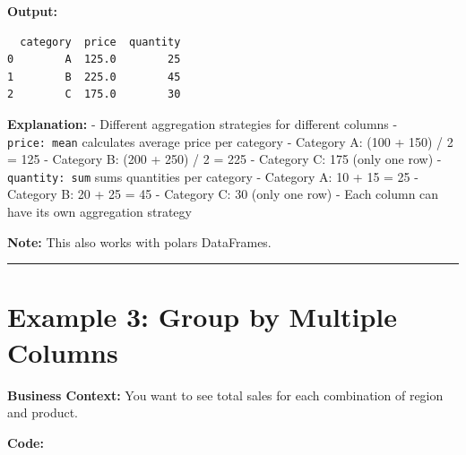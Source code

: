 \documentclass[
  letterpaper,
]{scrbook}
\begin{document}
\textbf{Output:}

\begin{verbatim}
  category  price  quantity
0        A  125.0        25
1        B  225.0        45
2        C  175.0        30
\end{verbatim}

\textbf{Explanation:} - Different aggregation strategies for different
columns -
\texttt{\textquotesingle{}price\textquotesingle{}:\ \textquotesingle{}mean\textquotesingle{}}
calculates average price per category - Category A: (100 + 150) / 2 =
125 - Category B: (200 + 250) / 2 = 225 - Category C: 175 (only one row)
-
\texttt{\textquotesingle{}quantity\textquotesingle{}:\ \textquotesingle{}sum\textquotesingle{}}
sums quantities per category - Category A: 10 + 15 = 25 - Category B: 20
+ 25 = 45 - Category C: 30 (only one row) - Each column can have its own
aggregation strategy

\textbf{Note:} This also works with polars DataFrames.

\begin{center}\rule{0.5\linewidth}{0.5pt}\end{center}

\section{Example 3: Group by Multiple
Columns}\label{example-3-group-by-multiple-columns}

\textbf{Business Context:} You want to see total sales for each
combination of region and product.

\textbf{Code:}
\end{document}
